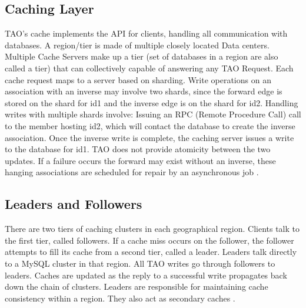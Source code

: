 \documentclass[9pt,twocolumn,twoside]{../../styles/osajnl}
\begin{document}

\subsection{Caching Layer}
TAO’s cache implements the API for clients, handling all communication with databases. A region/tier is made of multiple closely located Data centers. Multiple Cache Servers make up a tier (set of databases in a region are also called a tier) that can collectively capable of answering any TAO Request. Each cache request maps to a server based on sharding. Write operations on an association with an inverse may involve two shards, since the forward edge is stored on the shard for id1 and the inverse edge is on the shard for id2. Handling writes with multiple shards involve: Issuing an RPC (Remote Procedure Call) call to the member hosting id2, which will contact the database to create the inverse association. Once the inverse write is complete, the caching server issues a write to the database for id1. TAO does not provide atomicity between the two updates. If a failure occurs the forward may exist without an inverse, these hanging associations are scheduled for repair by an asynchronous job \cite{www-tao4}.

\subsection {Leaders and Followers}
There are two tiers of caching clusters in each geographical region. Clients talk to the first tier, called followers. If a cache miss occurs on the follower, the follower attempts to fill its cache from a second tier, called a leader. Leaders talk directly to a MySQL cluster in that region. All TAO writes go through followers to leaders. Caches are updated as the reply to a successful write propagates back down the chain of clusters. Leaders are responsible for maintaining cache consistency within a region. They also act as secondary caches \cite{www-tao2}.
\end{document}
